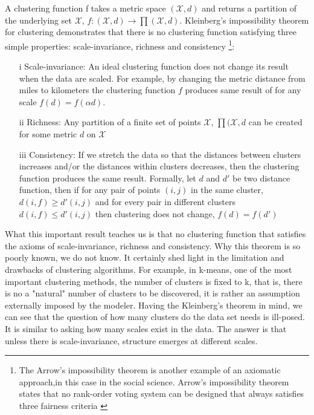 \documentclass[onecollarge,runningheads]{svjour2}
\begin{document}
A clustering function f takes a metric space $(\mathcal{X},d)$ and returns a partition of the underlying set $\mathcal{X}$, $f:(\mathcal{X},d) \to \prod(\mathcal{X},d)$. Kleinberg's impossibility theorem for clustering demonstrates that there is no clustering function satisfying three simple properties: scale-invariance, richness and consistency \footnote{The Arrow's impossibility theorem is another example of an axiomatic approach,in this case in the social science. Arrow's impossibility theorem states that 
 no rank-order voting system can be designed that always satisfies three fairness criteria \citep{arrow1950difficulty}}:
\begin{enumerate}
\item[i] Scale-invariance: An ideal clustering function does not change its result when the data are scaled. For example, by changing the metric distance from miles to kilometers the clustering function $f$ produces same result of for any scale $ f(d) = f(\alpha d)$.
\item[ii] Richness: Any partition of a finite set of points $\mathcal{X}$, $\prod(\mathcal{X},d$ can be created for some metric $d$ on $\mathcal{X}$ 
\item[iii] Consistency:  If we stretch the data so that the distances between clusters increases and/or the distances within clusters decreases, then  the clustering function produces the same result. Formally, let $d$ and $d'$ be two distance function, then if for any pair of points $(i,j)$ in the same cluster,$d(i,f) \geq d'(i,j)$ and for every pair in different clusters $d(i,f) \leq d'(i,j)$ then clustering does not change, $f(d)= f(d')$
\end{enumerate}
What this important result teaches us is that no clustering function that satisfies the axioms of scale-invariance, richness and consistency.
Why this theorem is so poorly known, we do not know. It certainly shed light in the limitation and drawbacks of clustering algorithms. 
For example, in k-means, one of the most important clustering methods, the number of clusters is fixed to k, that is, there is no a "natural" number of clusters to be discovered, it is rather an assumption externally imposed by the modeler. Having the Kleinberg's theorem in mind, we can see that the question of how many clusters do the data set needs is ill-posed. It is similar to asking how many scales exist in the data. The answer is that unless there is  scale-invariance, structure emerges at different scales. 
\end{document}
